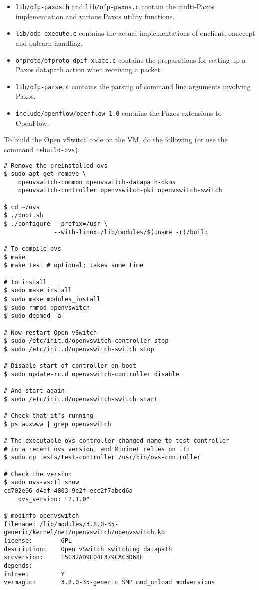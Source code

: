 \begin{itemize}
  \item \texttt{lib/ofp-paxos.h} and \texttt{lib/ofp-paxos.c} contain the
  multi-Paxos implementation and various Paxos utility functions.

  \item \texttt{lib/odp-execute.c} contains the actual implementations of
  onclient, onaccept and onlearn handling.

  \item \texttt{ofproto/ofproto-dpif-xlate.c} contains the preparations for
  setting up a Paxos datapath action when receiving a packet.

  \item \texttt{lib/ofp-parse.c} contains the parsing of command line
  arguments involving Paxos.

  \item \texttt{include/openflow/openflow-1.0} contains the Paxos extensions
  to OpenFlow.

\end{itemize}

To build the Open vSwitch code on the VM, do the following (or use the command
    \texttt{rebuild-ovs}).

\begin{Verbatim}
# Remove the preinstalled ovs
$ sudo apt-get remove \
    openvswitch-common openvswitch-datapath-dkms
    openvswitch-controller openvswitch-pki openvswitch-switch

$ cd ~/ovs
$ ./boot.sh
$ ./configure --prefix=/usr \
              --with-linux=/lib/modules/$(uname -r)/build

# To compile ovs
$ make
$ make test # optional; takes some time

# To install
$ sudo make install
$ sudo make modules_install
$ sudo rmmod openvswitch
$ sudo depmod -a

# Now restart Open vSwitch
$ sudo /etc/init.d/openvswitch-controller stop
$ sudo /etc/init.d/openvswitch-switch stop

# Disable start of controller on boot
$ sudo update-rc.d openvswitch-controller disable

# And start again
$ sudo /etc/init.d/openvswitch-switch start

# Check that it's running
$ ps auxwww | grep openvswitch

# The executable ovs-controller changed name to test-controller
# in a recent ovs version, and Mininet relies on it:
$ sudo cp tests/test-controller /usr/bin/ovs-controller

# Check the version
$ sudo ovs-vsctl show
cd702e96-d4af-4803-9e2f-ecc2f7abcd6a
    ovs_version: "2.1.0"

$ modinfo openvswitch
filename: /lib/modules/3.8.0-35-generic/kernel/net/openvswitch/openvswitch.ko
license:        GPL
description:    Open vSwitch switching datapath
srcversion:     15C32AD9E04F379CAC3D68E
depends:
intree:         Y
vermagic:       3.8.0-35-generic SMP mod_unload modversions
\end{Verbatim}

